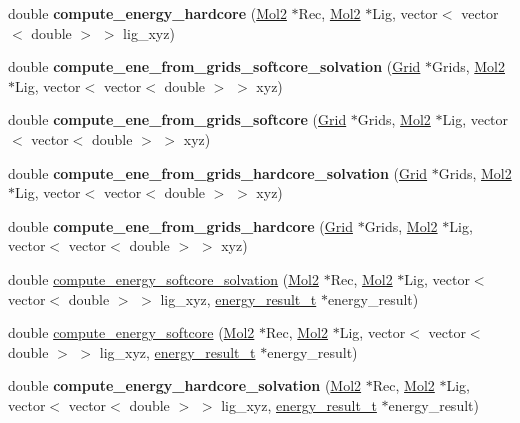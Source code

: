 \begin{DoxyCompactItemize}
\item 
\hypertarget{classEnergy2_aa82974473ccb43be045d488f05d38eee}{
double {\bfseries compute\_\-energy\_\-hardcore} (\hyperlink{classMol2}{Mol2} $\ast$Rec, \hyperlink{classMol2}{Mol2} $\ast$Lig, vector$<$ vector$<$ double $>$ $>$ lig\_\-xyz)}
\label{classEnergy2_aa82974473ccb43be045d488f05d38eee}

\item 
\hypertarget{classEnergy2_a3e8255bddfc1ff5e88ef94fadcdb47c2}{
double {\bfseries compute\_\-ene\_\-from\_\-grids\_\-softcore\_\-solvation} (\hyperlink{classGrid}{Grid} $\ast$Grids, \hyperlink{classMol2}{Mol2} $\ast$Lig, vector$<$ vector$<$ double $>$ $>$ xyz)}
\label{classEnergy2_a3e8255bddfc1ff5e88ef94fadcdb47c2}

\item 
\hypertarget{classEnergy2_acb9337e5b968239a2c7588e2e557f25b}{
double {\bfseries compute\_\-ene\_\-from\_\-grids\_\-softcore} (\hyperlink{classGrid}{Grid} $\ast$Grids, \hyperlink{classMol2}{Mol2} $\ast$Lig, vector$<$ vector$<$ double $>$ $>$ xyz)}
\label{classEnergy2_acb9337e5b968239a2c7588e2e557f25b}

\item 
\hypertarget{classEnergy2_a33b6f06a4ef1657edcabc6a6e332ba7f}{
double {\bfseries compute\_\-ene\_\-from\_\-grids\_\-hardcore\_\-solvation} (\hyperlink{classGrid}{Grid} $\ast$Grids, \hyperlink{classMol2}{Mol2} $\ast$Lig, vector$<$ vector$<$ double $>$ $>$ xyz)}
\label{classEnergy2_a33b6f06a4ef1657edcabc6a6e332ba7f}

\item 
\hypertarget{classEnergy2_ae090db2ca1e8b37093f23d1c2722d85e}{
double {\bfseries compute\_\-ene\_\-from\_\-grids\_\-hardcore} (\hyperlink{classGrid}{Grid} $\ast$Grids, \hyperlink{classMol2}{Mol2} $\ast$Lig, vector$<$ vector$<$ double $>$ $>$ xyz)}
\label{classEnergy2_ae090db2ca1e8b37093f23d1c2722d85e}

\item 
double \hyperlink{classEnergy2_aeaab8d7882978f706c549575abbfb571}{compute\_\-energy\_\-softcore\_\-solvation} (\hyperlink{classMol2}{Mol2} $\ast$Rec, \hyperlink{classMol2}{Mol2} $\ast$Lig, vector$<$ vector$<$ double $>$ $>$ lig\_\-xyz, \hyperlink{structenergy__result__t}{energy\_\-result\_\-t} $\ast$energy\_\-result)
\item 
double \hyperlink{classEnergy2_ade85175ed28a01f9e065683e7bb20a29}{compute\_\-energy\_\-softcore} (\hyperlink{classMol2}{Mol2} $\ast$Rec, \hyperlink{classMol2}{Mol2} $\ast$Lig, vector$<$ vector$<$ double $>$ $>$ lig\_\-xyz, \hyperlink{structenergy__result__t}{energy\_\-result\_\-t} $\ast$energy\_\-result)
\item 
\hypertarget{classEnergy2_aea2da15b31ab8c032e1d562989672fb1}{
double {\bfseries compute\_\-energy\_\-hardcore\_\-solvation} (\hyperlink{classMol2}{Mol2} $\ast$Rec, \hyperlink{classMol2}{Mol2} $\ast$Lig, vector$<$ vector$<$ double $>$ $>$ lig\_\-xyz, \hyperlink{structenergy__result__t}{energy\_\-result\_\-t} $\ast$energy\_\-result)}
\label{classEnergy2_aea2da15b31ab8c032e1d562989672fb1}


\end{DoxyCompactItemize}
